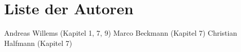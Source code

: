 \chapter*{Liste der Autoren}
Andreas Willems (Kapitel 1, 7, 9) \newline
Marco Beckmann (Kapitel 7) \newline
Christian Halfmann (Kapitel 7)